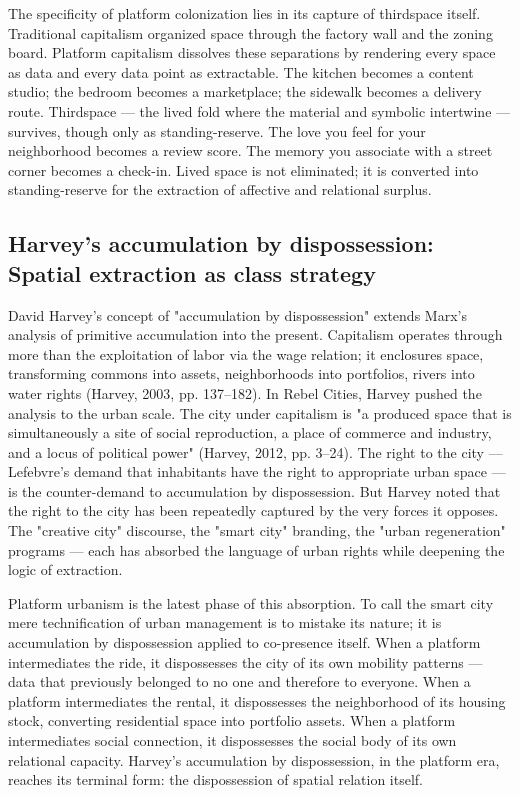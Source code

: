 The specificity of platform colonization lies in its capture of thirdspace itself. Traditional capitalism organized space through the factory wall and the zoning board. Platform capitalism dissolves these separations by rendering every space as data and every data point as extractable. The kitchen becomes a content studio; the bedroom becomes a marketplace; the sidewalk becomes a delivery route. Thirdspace — the lived fold where the material and symbolic intertwine — survives, though only as standing-reserve. The love you feel for your neighborhood becomes a review score. The memory you associate with a street corner becomes a check-in. Lived space is not eliminated; it is converted into standing-reserve for the extraction of affective and relational surplus.

\subsection{Harvey's accumulation by dispossession: Spatial extraction as class strategy}

David Harvey's concept of "accumulation by dispossession" extends Marx's analysis of primitive accumulation into the present. Capitalism operates through more than the exploitation of labor via the wage relation; it enclosures space, transforming commons into assets, neighborhoods into portfolios, rivers into water rights (Harvey, 2003, pp. 137–182). In Rebel Cities, Harvey pushed the analysis to the urban scale. The city under capitalism is "a produced space that is simultaneously a site of social reproduction, a place of commerce and industry, and a locus of political power" (Harvey, 2012, pp. 3–24). The right to the city — Lefebvre's demand that inhabitants have the right to appropriate urban space — is the counter-demand to accumulation by dispossession. But Harvey noted that the right to the city has been repeatedly captured by the very forces it opposes. The "creative city" discourse, the "smart city" branding, the "urban regeneration" programs — each has absorbed the language of urban rights while deepening the logic of extraction.

Platform urbanism is the latest phase of this absorption. To call the smart city mere technification of urban management is to mistake its nature; it is accumulation by dispossession applied to co-presence itself. When a platform intermediates the ride, it dispossesses the city of its own mobility patterns — data that previously belonged to no one and therefore to everyone. When a platform intermediates the rental, it dispossesses the neighborhood of its housing stock, converting residential space into portfolio assets. When a platform intermediates social connection, it dispossesses the social body of its own relational capacity. Harvey's accumulation by dispossession, in the platform era, reaches its terminal form: the dispossession of spatial relation itself.


